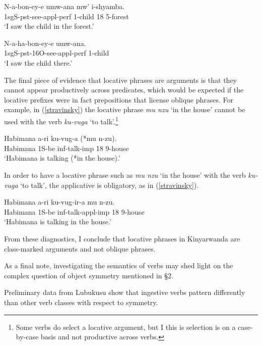 \documentclass[output=paper]{langsci/langscibook}
\begin{document}
\begin{exe}
	\ex\begin{xlist}
	\ex\label{loco}\gll N-a-bon-ey-e umw-ana mw' i-shyamba.\\
					1{\sc sg}S-{\sc pst}-see-{\sc appl-perf} 1-child 18 5-forest\\
					\glt `I saw the child in the forest.'
					
	\ex\label{locom}\gll N-a-ha-bon-ey-e umw-ana.\\
			1{\sc sg}S-{\sc pst-16O}-see-{\sc appl-perf} 1-child\\
			\glt `I saw the child there.'
	\end{xlist}
\end{exe}

 
 
 The final piece of evidence that locative phrases are arguments is that they cannot appear productively across predicates, which would be expected if the locative prefixes were in fact prepositions that license oblique phrases. For example, in (\ref{stravinsky}) the locative phrase \emph{mu nzu} `in the house' cannot be used with the verb \emph{ku-vuga} `to talk'.\footnote{Some verbs do select a locative argument, but I this is selection is on a case-by-case basis and not productive across verbs.}
 \begin{exe}
\ex\label{stravinsky}\gll Habimana a-ri ku-vug-a (*mu n-zu).\\
			Habimana 1S-{\sc be} {\sc inf}-talk-{\sc imp} \phantom{(*}18 9-house\\%
				\glt `Habimana is talking (*in the house).'
\end{exe}
In order to have a locative phrase such as \emph{mu nzu} `in the house' with the verb \emph{ku-vuga} `to talk', the applicative is obligatory, as in (\ref{stravinsky}).
\begin{exe}
\ex\label{stravinsky}\gll Habimana a-ri ku-vug-ir-a mu n-zu.\\
			Habimana 1S-{\sc be} {\sc inf}-talk-{\sc appl-imp} 18 9-house\\
				\glt `Habimana is talking in the house.'
\end{exe}
 From these diagnostics, I conclude that  locative phrases in Kinyarwanda are class-marked arguments and not oblique phrases. 
 
\iffalse 
  As a final note, investigating the semantics of verbs may shed light on the complex question of  object symmetry mentioned in \S2. 
 
  Preliminary data from Lubukusu show that ingestive verbs pattern differently than other verb classes with respect to symmetry. 
 
\end{document}
